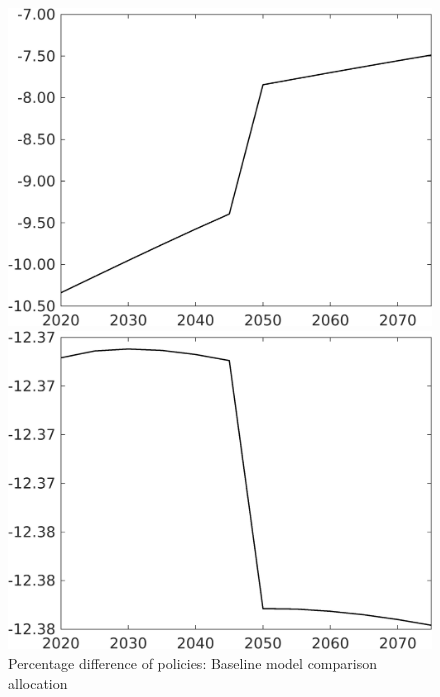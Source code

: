 \documentclass[12pt]{article}
\begin{document}
\begin{figure}[h!!]
	\centering
	\caption{Percentage difference of policies: Baseline model comparison allocation}\label{fig:Pertauf_nsk0_xgr1_notaul}
	\begin{minipage}[]{0.32\textwidth}
		\includegraphics[width=1\textwidth]{../../codding_model/own_basedOnFried/optimalPol_010922_revision/figures/all_13Sept22/CompTaufPER_bytaul_Reg0_tauf_spillover0_nsk0_xgr1_knspil0_sep1_LFlimit1_emsbase0_countec0_GovRev0_etaa0.79_lgd0.png}
	\end{minipage}		
	\begin{minipage}[]{0.32\textwidth}
		\includegraphics[width=1\textwidth]{../../codding_model/own_basedOnFried/optimalPol_010922_revision/figures/all_13Sept22/CompTaufPER_bytaul_Reg0_hh_spillover0_nsk0_xgr1_knspil0_sep1_LFlimit1_emsbase0_countec0_GovRev0_etaa0.79_lgd0.png}

\end{minipage}
\end{figure}
\end{document}
